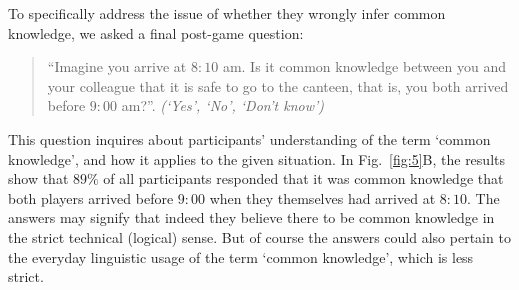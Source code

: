 \documentclass[twocolumn,a4paper,superscriptaddress,nofootinbib]{revtex4}
\begin{document}
To specifically address the issue of whether they wrongly infer common knowledge, we asked a final post-game question:

\begin{quote}
\indent
``Imagine you arrive at $8{:}10$ am. Is it common knowledge between you and your colleague that it is safe to go to the canteen, that is, you both arrived before $9{:}00$ am?''. \textit{(`Yes', `No', `Don't know')}
\end{quote}

\noindent
This question inquires about participants' understanding of the term `common knowledge', and how it applies to the given situation. In Fig.~\ref{fig:5}B, the results show that $89\%$ of all participants responded that it was common knowledge that both players arrived before $9{:}00$ when they themselves had arrived at $8{:}10$. The answers may signify that indeed they believe there to be common knowledge in the strict technical (logical) sense. But of course the answers could also pertain to the everyday linguistic usage of the term `common knowledge', which is less strict.
\end{document}
